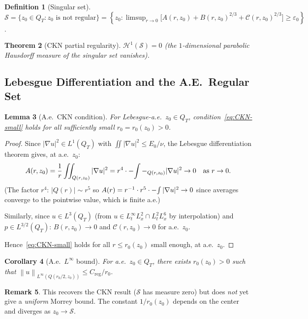 \documentclass[11pt]{article}
\newtheorem{theorem}{Theorem}[section]
\newtheorem{lemma}[theorem]{Lemma}
\newtheorem{corollary}[theorem]{Corollary}
\theoremstyle{definition}
\newtheorem{definition}[theorem]{Definition}
\newtheorem{remark}[theorem]{Remark}
\theoremstyle{remark}
\newcommand{\norm}[1]{\left\|#1\right\|}
\newcommand{\grad}{\nabla}
\newcommand{\Xint}{\mathop{\mathchoice{\vcenter{\hbox{$\displaystyle-$}}}%
  {\vcenter{\hbox{$\textstyle-$}}}%
  {\vcenter{\hbox{$\scriptstyle-$}}}%
  {\vcenter{\hbox{$\scriptscriptstyle-$}}}}\!\int}
\begin{document}
\begin{definition}[Singular set]\label{def:singular}
  $\mathcal{S} = \{z_0\in Q_T : z_0 \text{ is not regular}\}
  = \left\{z_0 : \limsup_{r\to 0}\bigl[A(r,z_0)+B(r,z_0)^{2/3}
    +\mathcal{C}(r,z_0)^{2/3}\bigr] \geq \varepsilon_0\right\}$.
\end{definition}

\begin{theorem}[CKN partial regularity]\label{thm:CKN-partial}
  $\mathcal{H}^1(\mathcal{S})=0$ (the $1$-dimensional parabolic
  Hausdorff measure of the singular set vanishes).
\end{theorem}

\subsection{Lebesgue Differentiation and the A.E.\ Regular Set}

\begin{lemma}[A.e.\ CKN condition]\label{lem:ae-CKN}
  For Lebesgue-a.e.\ $z_0\in Q_T$, condition~\eqref{eq:CKN-small}
  holds for all sufficiently small $r_0=r_0(z_0)>0$.
\end{lemma}

\begin{proof}
  Since $|\grad u|^2\in L^1(Q_T)$ with $\iint|\grad u|^2\leq E_0/\nu$,
  the Lebesgue differentiation theorem gives, at a.e.\ $z_0$:
  \[
    A(r,z_0) = \frac{1}{r}\iint_{Q(r,z_0)}|\grad u|^2
    = r^4 \cdot \Xint-_{Q(r,z_0)}|\grad u|^2 \to 0
    \quad\text{as }r\to 0.
  \]
  (The factor $r^4$: $|Q(r)|\sim r^5$ so $A(r)=r^{-1}\cdot r^5 \cdot
  \Xint|\grad u|^2\to 0$ since averages converge to the pointwise value,
  which is finite a.e.)

  Similarly, since $u\in L^3(Q_T)$ (from $u\in L^\infty_tL^2_x\cap L^2_tL^6_x$
  by interpolation) and $p\in L^{3/2}(Q_T)$:
  $B(r,z_0)\to 0$ and $\mathcal{C}(r,z_0)\to 0$ for a.e.\ $z_0$.

  Hence~\eqref{eq:CKN-small} holds for all $r\leq r_0(z_0)$ small enough,
  at a.e.\ $z_0$.
\end{proof}

\begin{corollary}[A.e.\ $L^\infty$ bound]\label{cor:ae-Linfty}
  For a.e.\ $z_0\in Q_T$, there exists $r_0(z_0)>0$ such that
  $\norm{u}_{L^\infty(Q(r_0/2,z_0))}\leq C_{\mathrm{reg}}/r_0$.
\end{corollary}

\begin{remark}
  This recovers the CKN result ($\mathcal{S}$ has measure zero) but does
  \emph{not} yet give a \emph{uniform} Morrey bound.  The constant
  $1/r_0(z_0)$ depends on the center and diverges as $z_0\to\mathcal{S}$.
\end{remark}
\end{document}
